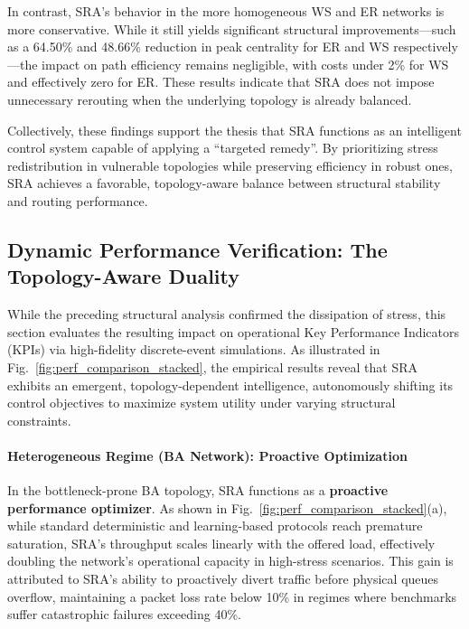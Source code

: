 \documentclass{ccjnl}
\begin{document}
In contrast, SRA's behavior in the more homogeneous WS and ER networks is more conservative. 
While it still yields significant structural improvements—such as a 64.50\% and 48.66\% reduction in peak centrality for ER and WS respectively—the impact on path efficiency remains negligible, with costs under 2\% for WS and effectively zero for ER. 
These results indicate that SRA does not impose unnecessary rerouting when the underlying topology is already balanced.

Collectively, these findings support the thesis that SRA functions as an intelligent control system capable of applying a ``targeted remedy''. 
By prioritizing stress redistribution in vulnerable topologies while preserving efficiency in robust ones, SRA achieves a favorable, topology-aware balance between structural stability and routing performance.

\subsection{Dynamic Performance Verification: The Topology-Aware Duality}
\label{subsec:dynamic_performance}

While the preceding structural analysis confirmed the dissipation of stress, this section evaluates the resulting impact on operational Key Performance Indicators (KPIs) via high-fidelity discrete-event simulations. 
As illustrated in Fig.~\ref{fig:perf_comparison_stacked}, the empirical results reveal that SRA exhibits an emergent, topology-dependent intelligence, autonomously shifting its control objectives to maximize system utility under varying structural constraints.

\paragraph{Heterogeneous Regime (BA Network): Proactive Optimization}
In the bottleneck-prone BA topology, SRA functions as a \textbf{proactive performance optimizer}. 
As shown in Fig.~\ref{fig:perf_comparison_stacked}(a), while standard deterministic and learning-based protocols reach premature saturation, SRA's throughput scales linearly with the offered load, effectively doubling the network's operational capacity in high-stress scenarios. 
This gain is attributed to SRA's ability to proactively divert traffic before physical queues overflow, maintaining a packet loss rate below 10\% in regimes where benchmarks suffer catastrophic failures exceeding 40\%.
\end{document}
